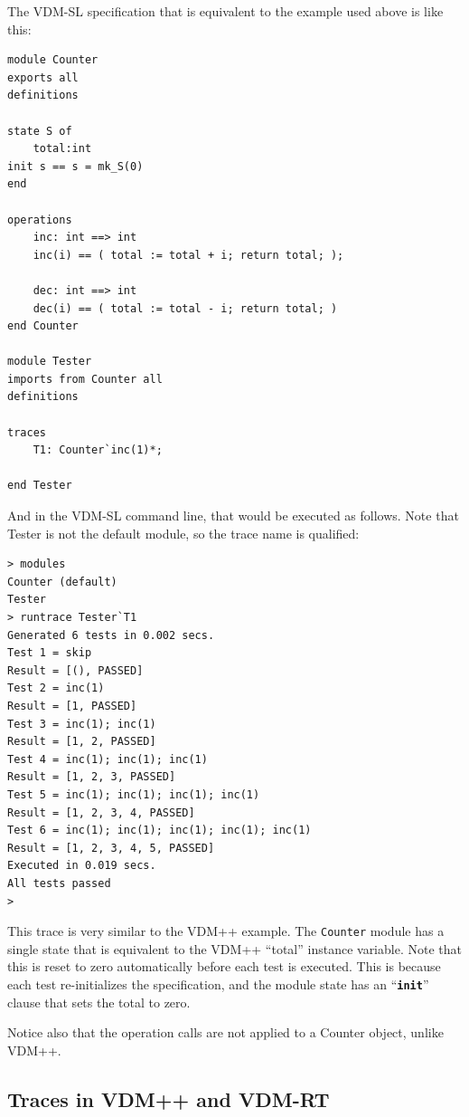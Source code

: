 \documentclass{overturerepchap}
\begin{document}
The VDM-SL specification that is equivalent to the example used above is like
this:

\small
\begin{lstlisting}
module Counter
exports all
definitions

state S of
    total:int
init s == s = mk_S(0)
end

operations
    inc: int ==> int
    inc(i) == ( total := total + i; return total; );

    dec: int ==> int
    dec(i) == ( total := total - i; return total; )
end Counter

module Tester
imports from Counter all
definitions

traces
    T1: Counter`inc(1)*;

end Tester
\end{lstlisting}
\normalsize

And in the VDM-SL command line, that would be executed as follows. Note that
Tester is not the default module, so the trace name is qualified:

\scriptsize
\lstset{style=tool,language=}
\begin{lstlisting}[escapechar=@]
> modules
Counter (default)
Tester
> runtrace Tester`T1
Generated 6 tests in 0.002 secs. 
Test 1 = skip
Result = [(), PASSED]
Test 2 = inc(1)
Result = [1, PASSED]
Test 3 = inc(1); inc(1)
Result = [1, 2, PASSED]
Test 4 = inc(1); inc(1); inc(1)
Result = [1, 2, 3, PASSED]
Test 5 = inc(1); inc(1); inc(1); inc(1)
Result = [1, 2, 3, 4, PASSED]
Test 6 = inc(1); inc(1); inc(1); inc(1); inc(1)
Result = [1, 2, 3, 4, 5, PASSED]
Executed in 0.019 secs. 
All tests passed
>
\end{lstlisting}
\lstset{style=mystyle}
\lstset{language=VDM++}
\normalsize

This trace is very similar to the VDM++ example. The \texttt{Counter} module has a
single state that is equivalent to the VDM++ ``total'' instance variable. Note
that this is reset to zero automatically before each test is executed. This is
because each test re-initializes the specification, and the module
state has an ``\texttt{\textbf{init}}'' clause that sets the total to zero.

Notice also that the operation calls are not applied to a Counter object, unlike
VDM++.

\subsection{Traces in VDM++ and VDM-RT}
\end{document}
